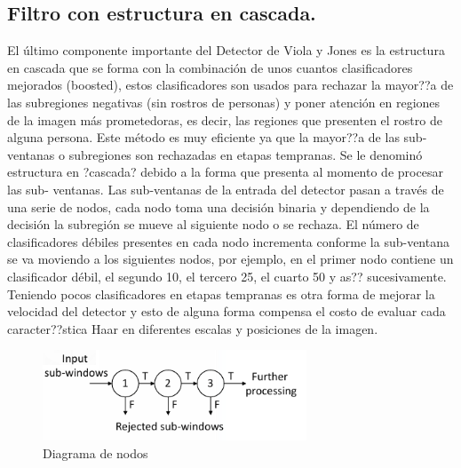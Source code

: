    \subsection{Filtro con estructura en cascada.}
   El último componente importante del Detector de Viola y Jones es la estructura en cascada que se forma con la combinación de unos cuantos clasificadores mejorados (boosted), estos clasificadores son usados para rechazar la mayor??a de las subregiones negativas (sin rostros de personas) y poner atención en regiones de la imagen más prometedoras, es decir, las regiones que presenten el rostro de alguna persona. Este método es muy eficiente ya que la mayor??a de las sub-ventanas o subregiones son rechazadas en etapas tempranas. Se le denominó estructura en ?cascada? debido a la forma que presenta al momento de procesar las sub- ventanas. Las sub-ventanas de la entrada del detector pasan a través de una serie de nodos, cada nodo toma una decisión binaria y dependiendo de la decisión la subregión se mueve al siguiente nodo o se rechaza. El número de clasificadores débiles presentes en cada nodo incrementa conforme la sub-ventana se va moviendo a los siguientes nodos, por ejemplo, en el primer nodo contiene un clasificador débil, el segundo 10, el tercero 25, el cuarto 50 y as?? sucesivamente. Teniendo pocos clasificadores en etapas tempranas es otra forma de mejorar la velocidad del detector y esto de alguna forma compensa el costo de evaluar cada caracter??stica Haar en diferentes escalas y posiciones de la imagen.
   \begin{figure}[htbp]
   	\centering
   	\includegraphics[width=0.7\textwidth]{./pictures/cascada}
   	\caption{Diagrama de nodos}\label{fig: figura}
   \end{figure}
   

